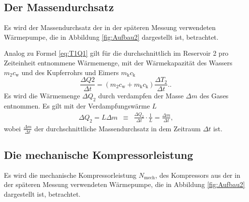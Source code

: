 \subsection{Der Massendurchsatz}
Es wird der Massendurchsatz der in der späteren Messung verwendeten Wärmepumpe, die in Abbildung \ref{fig:Aufbau2} dargestellt ist, betrachtet.

Analog zu Formel \eqref{eq:T1Q1} gilt für die durchschnittlich im Reservoir 2 pro Zeiteinheit entnommene Wärmemenge, mit der Wärmekapazität des Wassers $m_2c_\text{w}$ und des Kupferrohrs und Eimers $m_\text{k}c_\text{k}$
\begin{equation}
\frac{\Delta Q2}{\Delta t} = \left( m_2c_\text{w} + m_\text{k}c_\text{k}\right) \frac{\Delta T_2}{\Delta t}\text{.}\label{eq:T2Q2}\text{.}
\end{equation}
Es wird die Wärmemenge $\Delta Q_2$ durch verdampfen der Masse $\Delta m$ des Gases entnommen.
Es gilt mit der Verdampfungswärme $L$
\begin{equation}
\begin{aligned}
\Delta Q_2 = L \Delta m & \equiv & \frac{\Delta Q_2}{\Delta t} \cdot \frac{1}{L} = \frac{\Delta m}{\Delta t}\text{,}
\end{aligned}
\end{equation}
wobei $\frac{\Delta m}{\Delta t}$ der durchschnittliche Massendurchsatz in dem Zeitraum $\Delta t$ ist.

\subsection{Die mechanische Kompressorleistung}
Es wird die mechanische Kompressorleistung $N_\text{mech}$, des Kompressors aus der in der späteren Messung verwendeten Wärmepumpe, die in Abbildung \ref{fig:Aufbau2} dargestellt ist, betrachtet.

